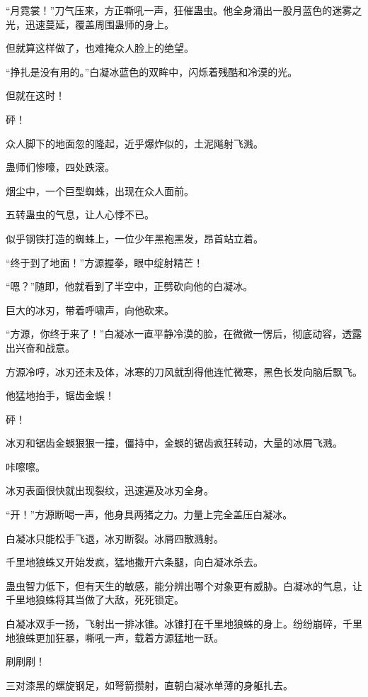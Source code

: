 
\begin{this_body}

“月霓裳！”刀气压来，方正嘶吼一声，狂催蛊虫。他全身涌出一股月蓝色的迷雾之光，迅速蔓延，覆盖周围蛊师的身上。

但就算这样做了，也难掩众人脸上的绝望。

“挣扎是没有用的。”白凝冰蓝色的双眸中，闪烁着残酷和冷漠的光。

但就在这时！

砰！

众人脚下的地面忽的隆起，近乎爆炸似的，土泥飚射飞溅。

蛊师们惨嚎，四处跌滚。

烟尘中，一个巨型蜘蛛，出现在众人面前。

五转蛊虫的气息，让人心悸不已。

似乎钢铁打造的蜘蛛上，一位少年黑袍黑发，昂首站立着。

“终于到了地面！”方源握拳，眼中绽射精芒！

“嗯？”随即，他就看到了半空中，正劈砍向他的白凝冰。

巨大的冰刃，带着呼啸声，向他砍来。

“方源，你终于来了！”白凝冰一直平静冷漠的脸，在微微一愣后，彻底动容，透露出兴奋和战意。

方源冷哼，冰刃还未及体，冰寒的刀风就刮得他连忙微寒，黑色长发向脑后飘飞。

他猛地抬手，锯齿金蜈！

砰！

冰刃和锯齿金蜈狠狠一撞，僵持中，金蜈的锯齿疯狂转动，大量的冰屑飞溅。

咔嚓嚓。

冰刃表面很快就出现裂纹，迅速遍及冰刃全身。

“开！”方源断喝一声，他身具两猪之力。力量上完全盖压白凝冰。

白凝冰只能松手飞退，冰刃断裂。冰屑四散溅射。

千里地狼蛛又开始发疯，猛地撒开六条腿，向白凝冰杀去。

蛊虫智力低下，但有天生的敏感，能分辨出哪个对象更有威胁。白凝冰的气息，让千里地狼蛛将其当做了大敌，死死锁定。

白凝冰双手一扬，飞射出一排冰锥。冰锥打在千里地狼蛛的身上。纷纷崩碎，千里地狼蛛更加狂暴，嘶吼一声，载着方源猛地一跃。

刷刷刷！

三对漆黑的螺旋钢足，如弩箭攒射，直朝白凝冰单薄的身躯扎去。


\end{this_body}
